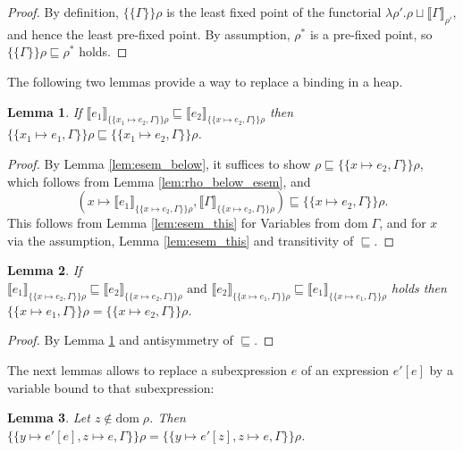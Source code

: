 \documentclass{jfp1}
\newtheorem{lemma}{Lemma}
\theoremstyle{nonumberbreak}
\newtheorem{proof}{Proof}
\newcommand{\dom}[1]{\text{dom}\;#1}
\newcommand{\dsem}[2]{\llbracket #1 \rrbracket_{#2}}
\newcommand{\esem}[1]{\{\!\!\!\{#1\}\!\!\!\}}
\begin{document}
\begin{proof}
By definition, $\esem{\Gamma}\rho$ is the least fixed point of the functorial $\lambda \rho'. \rho \sqcup \dsem{\Gamma}{\rho'}$, and hence the least pre-fixed point. By assumption, $\rho^*$ is a pre-fixed point, so $\esem{\Gamma}\rho \sqsubseteq \rho^*$ holds.
\end{proof}

The following two lemmas provide a way to replace a binding in a heap.
\begin{lemma}
If $\dsem{e_1}{\esem{x_1 \mapsto e_2, \Gamma}\rho} \sqsubseteq \dsem{e_2}{\esem{x \mapsto e_2, \Gamma}\rho}$
then $\esem{x_1 \mapsto e_1, \Gamma}\rho \sqsubseteq \esem{x_1 \mapsto e_2, \Gamma}\rho$.
\label{lem:esem_subst_expr_below}
\end{lemma}

\begin{proof}
By Lemma \ref{lem:esem_below}, it suffices to show $\rho \sqsubseteq \esem{x \mapsto e_2, \Gamma}\rho$, which follows from  Lemma \ref{lem:rho_below_esem}, and 
\[
(x \mapsto \dsem{e_1}{\esem{x \mapsto e_2, \Gamma}\rho}, \dsem{\Gamma}{\esem{x \mapsto e_2, \Gamma}\rho}) \sqsubseteq \esem{x \mapsto e_2, \Gamma}\rho.
\]
This follows from Lemma \ref{lem:esem_this} for Variables from $\dom\Gamma$, and for $x$ via the assumption, Lemma \ref{lem:esem_this} and transitivity of $\sqsubseteq$.
\end{proof}

\begin{lemma}
If
$\dsem{e_1}{\esem{x \mapsto e_2, \Gamma}\rho} \sqsubseteq \dsem{e_2}{\esem{x \mapsto e_2, \Gamma}\rho}
\text{ and }
\dsem{e_2}{\esem{x \mapsto e_1, \Gamma}\rho} \sqsubseteq \dsem{e_1}{\esem{x \mapsto e_1, \Gamma}\rho}
$
holds then $\esem{x \mapsto e_1, \Gamma}\rho = \esem{x \mapsto e_2, \Gamma}\rho$.
\label{lem:esem_subst_expr}
\end{lemma}

\begin{proof}
By Lemma \ref{lem:esem_subst_expr_below} and antisymmetry of $\sqsubseteq$.
\end{proof}

The next lemmas allows to replace a subexpression $e$ of an expression $e'[e]$ by a variable bound to that subexpression:

\begin{lemma}
Let $z \notin \dom \rho$. Then $\esem{y \mapsto e'[e], z \mapsto e, \Gamma}\rho = \esem{y \mapsto e'[z], z \mapsto e, \Gamma}\rho$.
\label{lem:exp_var_subst}
\label{lem:var_var_subst}
\end{lemma}
\end{document}
